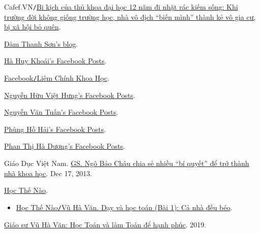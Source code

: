 \documentclass{article}
\numberwithin{equation}{section}
\begin{document}
\begin{thebibliography}{99}
	 Cafef.VN\texttt{/}\href{https://cafef.vn/chi-vi-1-lua-chon-sai-lam-trong-su-nghiep-hoc-gia-hang-dau-bit-phai-danh-doi-ca-cuoc-doi-nhat-rac-lang-thang-suot-12-nam-moi-nhan-ra-hoa-giai-voi-chinh-minh-la-viec-kho-lam-nhat-20220221131928932.chn?fbclid=IwAR2CafAOyG7NEOuxUXGPOsadQI_K8vMHfokm-OS5SfBIiUCMYnDvD4SfO60}{Bi kịch của thủ khoa đại học 12 năm đi nhặt rác kiếm sống: Khi trường đời không giống trường học, nhà vô địch ``biến mình'' thành kẻ vô gia cư, bị xã hội bỏ quên}.
	
	 \href{https://damtson.wordpress.com/}{Đàm Thanh Sơn's blog}.
	
	 \href{https://www.facebook.com/hahuy.khoai}{Hà Huy Khoái's Facebook Posts}.
	
	 \href{https://www.facebook.com/groups/LiemChinhKhoaHoc}{Facebook\texttt{/}Liêm Chính Khoa Học}.
	
	 \href{https://www.facebook.com/nhvhung}{Nguyễn Hữu Việt Hưng's Facebook Posts}.
	
	 \href{https://www.facebook.com/t.nguyen.2016}{Nguyễn Văn Tuấn's Facebook Posts}.
	
	 \href{https://www.facebook.com/hai.phungho.5}{Phùng Hồ Hải's Facebook Posts}.
	
	 \href{https://www.facebook.com/phan.t.duong.9}{Phan Thị Hà Dương's Facebook Posts}.
	
	 Giáo Dục Việt Nam. \href{https://giaoduc.net.vn/giao-duc-24h/gs-ngo-bao-chau-chia-se-nhieu-bi-quyet-de-tro-thanh-nha-khoa-hoc-post135782.gd}{GS. Ngô Bảo Châu chia sẻ nhiều ``bí quyết'' để trở thành nhà khoa học}. Dec 17, 2013.
	
	 \href{http://hocthenao.vn/}{Học Thế Nào}.
	\begin{itemize}
		\item  \href{http://hocthenao.vn/day-va-hoc-toan-bai-1-ca-nha-deu-beo/}{Học Thế Nào\texttt{/}Vũ Hà Văn. Dạy và học toán (Bài 1): Cả nhà đều béo}.
	\end{itemize}
	
	 \href{https://www.mathvn.com/2019/03/giao-su-vu-ha-van-hoc-toan-va-lam-toan.html}{Giáo sư Vũ Hà Văn: Học Toán và làm Toán để hạnh phúc}. 2019.
	

\end{thebibliography}
\end{document}

